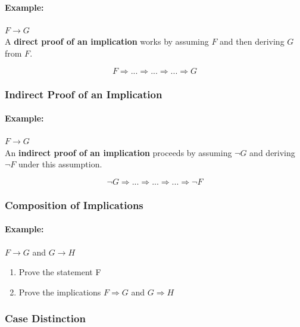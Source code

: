 \documentclass[11pt]{article}
\begin{document}
\paragraph{Example:} $F \rightarrow G$ \\

A \textbf{direct proof of an implication} works by assuming $F$ and then deriving $G$ from $F$.

\begin{equation*}
	F \Rightarrow ... \Rightarrow ... \Rightarrow ... \Rightarrow G
\end{equation*}

\subsubsection{Indirect Proof of an Implication}

\paragraph{Example:} $F \rightarrow G$ \\

An \textbf{indirect proof of an implication} proceeds by assuming $\neg G$ and deriving $\neg F$ under this assumption.

\begin{equation*}
	\neg G \Rightarrow ... \Rightarrow ... \Rightarrow ... \Rightarrow \neg F
\end{equation*}

\subsubsection{Composition of Implications}

\paragraph{Example:} $F \rightarrow G$ and $G \rightarrow H$

\begin{enumerate}
	\item Prove the statement F
	\item Prove the implications $F \Rightarrow G$ and $G \Rightarrow H$
\end{enumerate}

\subsubsection{Case Distinction}
\end{document}
